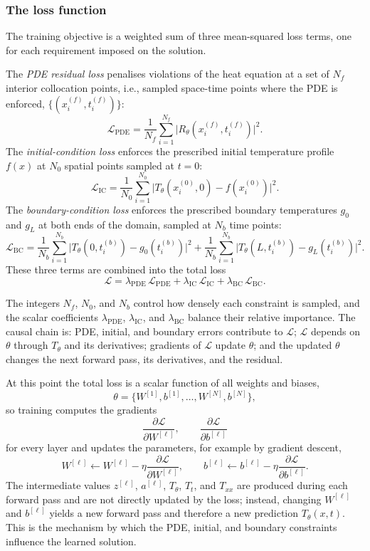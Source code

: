 \documentclass[11pt,letterpaper]{article}
\begin{document}
\subsubsection*{The loss function}

The training objective is a weighted sum of three mean-squared loss terms, one for each
requirement imposed on the solution.

The \emph{PDE residual loss} penalises violations of the heat equation at a set of
$N_f$ interior collocation points, i.e., sampled space-time points where the PDE is enforced,
$\{(x_i^{(f)}, t_i^{(f)})\}$:
\[
\mathcal{L}_{\mathrm{PDE}}
= \frac{1}{N_f}\sum_{i=1}^{N_f}
\bigl|R_\theta(x_i^{(f)}, t_i^{(f)})\bigr|^2.
\]
The \emph{initial-condition loss} enforces the prescribed initial temperature profile
$f(x)$ at $N_0$ spatial points sampled at $t = 0$:
\[
\mathcal{L}_{\mathrm{IC}}
= \frac{1}{N_0}\sum_{i=1}^{N_0}
\bigl|T_\theta(x_i^{(0)}, 0) - f(x_i^{(0)})\bigr|^2.
\]
The \emph{boundary-condition loss} enforces the prescribed boundary temperatures $g_0$ and
$g_L$ at both ends of the domain, sampled at $N_b$ time points:
\[
\mathcal{L}_{\mathrm{BC}}
= \frac{1}{N_b}\sum_{i=1}^{N_b}
\bigl|T_\theta(0, t_i^{(b)}) - g_0(t_i^{(b)})\bigr|^2
+ \frac{1}{N_b}\sum_{i=1}^{N_b}
\bigl|T_\theta(L, t_i^{(b)}) - g_L(t_i^{(b)})\bigr|^2.
\]
These three terms are combined into the total loss
\[
\mathcal{L}
= \lambda_{\mathrm{PDE}}\,\mathcal{L}_{\mathrm{PDE}}
+ \lambda_{\mathrm{IC}}\,\mathcal{L}_{\mathrm{IC}}
+ \lambda_{\mathrm{BC}}\,\mathcal{L}_{\mathrm{BC}}.
\]

The integers $N_f$, $N_0$, and $N_b$ control how densely each constraint is sampled, and the scalar
coefficients $\lambda_{\mathrm{PDE}}$, $\lambda_{\mathrm{IC}}$, and $\lambda_{\mathrm{BC}}$ balance their relative
importance. The causal chain is: PDE, initial, and boundary errors contribute to $\mathcal{L}$;
$\mathcal{L}$ depends on $\theta$ through $T_\theta$ and its derivatives; gradients of $\mathcal{L}$
update $\theta$; and the updated $\theta$ changes the next forward pass, its derivatives, and the
residual.

At this point the total loss is a scalar function of all weights and biases,
\[
\theta = \{W^{[1]}, b^{[1]}, \dots, W^{[N]}, b^{[N]}\},
\]
so training computes the gradients
\[
\frac{\partial \mathcal{L}}{\partial W^{[\ell]}}, \qquad
\frac{\partial \mathcal{L}}{\partial b^{[\ell]}}
\]
for every layer and updates the parameters, for example by gradient descent,
\[
W^{[\ell]} \leftarrow W^{[\ell]} - \eta \frac{\partial \mathcal{L}}{\partial W^{[\ell]}},
\qquad
b^{[\ell]} \leftarrow b^{[\ell]} - \eta \frac{\partial \mathcal{L}}{\partial b^{[\ell]}}.
\]
The intermediate values $z^{[\ell]}$, $a^{[\ell]}$, $T_\theta$, $T_t$, and $T_{xx}$ are produced during
each forward pass and are not directly updated by the loss; instead, changing $W^{[\ell]}$ and
$b^{[\ell]}$ yields a new forward pass and therefore a new prediction $T_\theta(x,t)$. This is the
mechanism by which the PDE, initial, and boundary constraints influence the learned solution.
\end{document}
